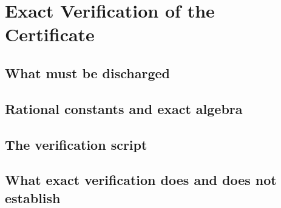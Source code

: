 
\section{Exact Verification of the Certificate}
\label{apx:exact}

\subsection{What must be discharged}
\label{sub:apx_what_must_be_discharged}

\subsection{Rational constants and exact algebra}
\label{sub:apx_rational_constants}

\subsection{The verification script}
\label{sub:apx_verification_script}

\subsection{What exact verification does and does not establish}
\label{sub:apx_scope_of_verification}
